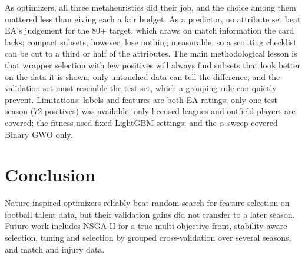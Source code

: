 \documentclass[runningheads]{llncs}
\begin{document}
As optimizers, all three metaheuristics did their job, and the choice among them mattered less than giving each a fair budget. As a predictor, no attribute set beat EA's judgement for the 80+ target, which draws on match information the card lacks; compact subsets, however, lose nothing measurable, so a scouting checklist can be cut to a third or half of the attributes. The main methodological lesson is that wrapper selection with few positives will always find subsets that look better on the data it is shown; only untouched data can tell the difference, and the validation set must resemble the test set, which a grouping rule can quietly prevent. Limitations: labels and features are both EA ratings; only one test season (72 positives) was available; only licensed leagues and outfield players are covered; the fitness used fixed LightGBM settings; and the $\alpha$ sweep covered Binary GWO only.

\section{Conclusion}

Nature-inspired optimizers reliably beat random search for feature selection on football talent data, but their validation gains did not transfer to a later season. Future work includes NSGA-II for a true multi-objective front, stability-aware selection, tuning and selection by grouped cross-validation over several seasons, and match and injury data.



\end{document}
